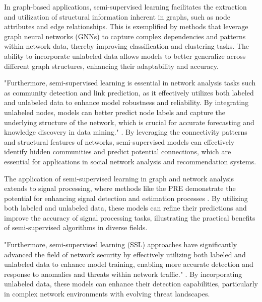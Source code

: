 In graph-based applications, semi-supervised learning facilitates the extraction and utilization of structural information inherent in graphs, such as node attributes and edge relationships. This is exemplified by methods that leverage graph neural networks (GNNs) to capture complex dependencies and patterns within network data, thereby improving classification and clustering tasks. The ability to incorporate unlabeled data allows models to better generalize across different graph structures, enhancing their adaptability and accuracy.



"Furthermore, semi-supervised learning is essential in network analysis tasks such as community detection and link prediction, as it effectively utilizes both labeled and unlabeled data to enhance model robustness and reliability. By integrating unlabeled nodes, models can better predict node labels and capture the underlying structure of the network, which is crucial for accurate forecasting and knowledge discovery in data mining." \cite{ullah2019graphconvolutionalnetworksanalysis,kawase2022stochasticsolutionsdensesubgraph}. By leveraging the connectivity patterns and structural features of networks, semi-supervised models can effectively identify hidden communities and predict potential connections, which are essential for applications in social network analysis and recommendation systems.



The application of semi-supervised learning in graph and network analysis extends to signal processing, where methods like the PRE demonstrate the potential for enhancing signal detection and estimation processes \cite{liu2020posteriorratioestimationlatent}. By utilizing both labeled and unlabeled data, these models can refine their predictions and improve the accuracy of signal processing tasks, illustrating the practical benefits of semi-supervised algorithms in diverse fields.



"Furthermore, semi-supervised learning (SSL) approaches have significantly advanced the field of network security by effectively utilizing both labeled and unlabeled data to enhance model training, enabling more accurate detection and response to anomalies and threats within network traffic." \cite{ullah2019graphconvolutionalnetworksanalysis,liu2023realtimesafetyassessmentdynamic}. By incorporating unlabeled data, these models can enhance their detection capabilities, particularly in complex network environments with evolving threat landscapes.



